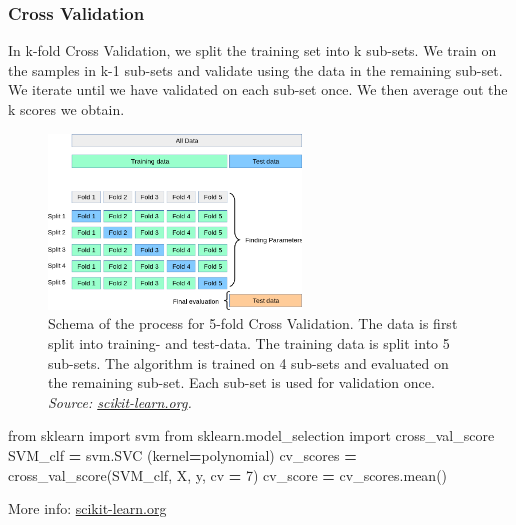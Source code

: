 \documentclass[
]{book}
\newenvironment{Shaded}{\begin{snugshade}}{\end{snugshade}}
\newcommand{\DecValTok}[1]{\textcolor[rgb]{0.00,0.00,0.81}{#1}}
\newcommand{\ImportTok}[1]{#1}
\newcommand{\NormalTok}[1]{#1}
\newcommand{\OperatorTok}[1]{\textcolor[rgb]{0.81,0.36,0.00}{\textbf{#1}}}
\newcommand{\StringTok}[1]{\textcolor[rgb]{0.31,0.60,0.02}{#1}}
\begin{document}
\hypertarget{crossval}{%
\subsubsection{Cross Validation}\label{crossval}}

In k-fold Cross Validation, we split the training set into k sub-sets.
We train on the samples in k-1 sub-sets and validate using the data in
the remaining sub-set. We iterate until we have validated on each
sub-set once. We then average out the k scores we obtain.

\begin{figure}
\centering
\includegraphics[width=0.6\textwidth,height=\textheight]{figures/cross_validation.png}
\caption{Schema of the process for 5-fold Cross Validation. The data is first
split into training- and test-data. The training data is split into 5
sub-sets. The algorithm is trained on 4 sub-sets and evaluated on the
remaining sub-set. Each sub-set is used for validation once. \emph{Source:
\href{https://scikit-learn.org/stable/modules/cross_validation.html}{scikit-learn.org}.}}
\end{figure}

\begin{Shaded}
\begin{Highlighting}[]
\ImportTok{from}\NormalTok{ sklearn }\ImportTok{import}\NormalTok{ svm}
\ImportTok{from}\NormalTok{ sklearn.model\_selection }\ImportTok{import}\NormalTok{ cross\_val\_score}
\NormalTok{SVM\_clf }\OperatorTok{=}\NormalTok{ svm.SVC (kernel}\OperatorTok{=}\StringTok{\textquotesingle{}polynomial\textquotesingle{}}\NormalTok{)}
\NormalTok{cv\_scores }\OperatorTok{=}\NormalTok{ cross\_val\_score(SVM\_clf, X, y, cv }\OperatorTok{=} \DecValTok{7}\NormalTok{)}
\NormalTok{cv\_score }\OperatorTok{=}\NormalTok{ cv\_scores.mean()}
\end{Highlighting}
\end{Shaded}

More info:
\href{https://scikit-learn.org/stable/modules/cross_validation.html\#computing-cross-validated-metrics}{scikit-learn.org}
\end{document}
